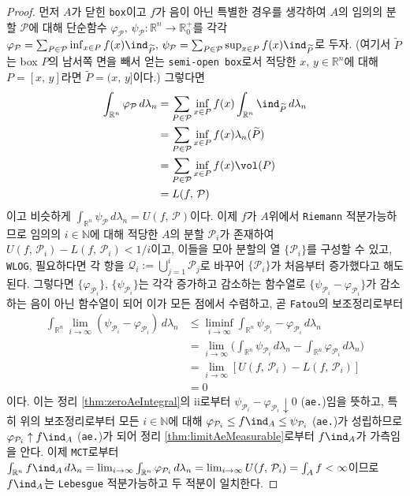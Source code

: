 \begin{proof}
    먼저 $A$가 닫힌 \texttt{box}이고 $f$가 음이 아닌 특별한 경우를 생각하여 $A$의 임의의 분할 $\mathcal{P}$에 대해 단순함수 $\varphi_\mathcal{P},\,\psi_\mathcal{P}:\mathbb{R}^n\to\mathbb{R}^+_0$를 각각 $\varphi_\mathcal{P}=\sum_{P\in\mathcal{P}}\inf_{x\in P}f(x)\ind_{\widetilde{P}},\,\psi_\mathcal{P}=\sum_{P\in\mathcal{P}}\sup_{x\in P}f(x)\ind_{\widetilde{P}}$로 두자. (여기서 $\widetilde{P}$는 box $P$의 남서쪽 면을 빼서 얻는 \texttt{semi-open box}로서 적당한 $x,\,y\in\mathbb{R}^n$에 대해 $P=[x,\,y]$라면 $\widetilde{P}=(x,\,y]$이다.) 그렇다면
    \begin{align*}
        \int_{\mathbb{R}^n}\varphi_\mathcal{P}\,d\lambda_n&=\sum_{P\in\mathcal{P}}\inf_{x\in P}f(x)\int_{\mathbb{R}^n}\ind_{\widetilde{P}}\,d\lambda_n\\
        &=\sum_{P\in\mathcal{P}}\inf_{x\in P}f(x)\lambda_n(\widetilde{P})\\
        &=\sum_{P\in\mathcal{P}}\inf_{x\in P}f(x)\vol(P)\\
        &=L(f,\,\mathcal{P})
    \end{align*}
    이고 비슷하게 $\int_{\mathbb{R}^n}\psi_\mathcal{P}\,d\lambda_n=U(f,\,\mathcal{P})$이다. 이제 $f$가 $A$위에서 \texttt{Riemann} 적분가능하므로 임의의 $i\in\mathbb{N}$에 대해 적당한 $A$의 분할 $\mathcal{P}_i$가 존재하여 $U(f,\,\mathcal{P}_i)-L(f,\,\mathcal{P}_i)<1/i$이고, 이들을 모아 분할의 열 $\{\mathcal{P}_i\}$를 구성할 수 있고, \texttt{WLOG}, 필요하다면 각 항을 $\mathcal{Q}_i:=\bigcup_{j=1}^i\mathcal{P}_j$로 바꾸어 $\{\mathcal{P}_i\}$가 처음부터 증가했다고 해도 된다. 그렇다면 $\{\varphi_{\mathcal{P}_i}\},\,\{\psi_{\mathcal{P}_i}\}$는 각각 증가하고 감소하는 함수열로 $\{\psi_{\mathcal{P}_i}-\varphi_{\mathcal{P}_i}\}$가 감소하는 음이 아닌 함수열이 되어 이가 모든 점에서 수렴하고, 곧 \texttt{Fatou}의 보조정리로부터
    \begin{align*}
        \int_{\mathbb{R}^n}\lim_{i\to\infty}(\psi_{\mathcal{P}_i}-\varphi_{\mathcal{P}_i})\,d\lambda_n&\leq\liminf_{i\to\infty}\int_{\mathbb{R}^n}\psi_{\mathcal{P}_i}-\varphi_{\mathcal{P}_i}\,d\lambda_n\\
        &=\lim_{i\to\infty}\bigg(\int_{\mathbb{R}^n}\psi_{\mathcal{P}_i}\,d\lambda_n-\int_{\mathbb{R}^n}\varphi_{\mathcal{P}_i}\,d\lambda_n\bigg)\\
        &=\lim_{i\to\infty}[U(f,\,\mathcal{P}_i)-L(f,\,\mathcal{P}_i)]\\
        &=0
    \end{align*}
    이다. 이는 정리 \ref{thm:zeroAeIntegral}의 ii로부터 $\psi_{\mathcal{P}_i}-\varphi_{\mathcal{P}_i}\downarrow0$ (\texttt{ae.})임을 뜻하고, 특히 위의 보조정리로부터 모든 $i\in\mathbb{N}$에 대해 $\varphi_{\mathcal{P}_i}\leq f\ind_A\leq\psi_{\mathcal{P}_i}$ (\texttt{ae.})가 성립하므로\footnotemark $\varphi_{\mathcal{P}_i}\uparrow f\ind_A$ (\texttt{ae.})가 되어 정리 \ref{thm:limitAeMeasurable}로부터 $f\ind_A$가 가측임을 안다. 이제 \texttt{MCT}로부터 $\int_{\mathbb{R}^n}f\ind_A\,d\lambda_n=\lim_{i\to\infty}\int_{\mathbb{R}^n}\varphi_{\mathcal{P}_i}\,d\lambda_n=\lim_{i\to\infty} U(f,\,\mathcal{P}_i)=\int_Af<\infty$이므로 $f\ind_A$는 \texttt{Lebesgue} 적분가능하고 두 적분이 일치한다.


\end{proof}
